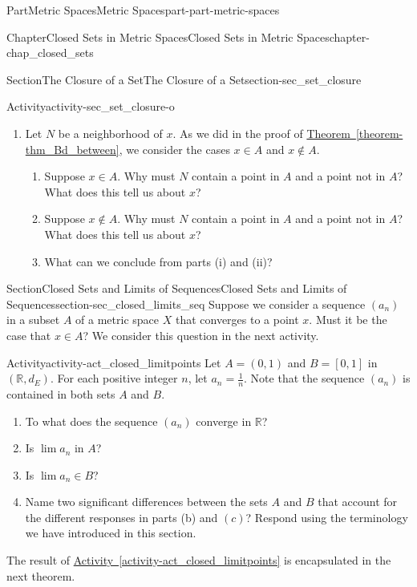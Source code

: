 \documentclass[oneside,10pt,]{book}
\newcommand{\xreffont}{\relax}
\numberwithin{equation}{chapter}
\newcommand{\R}{\mathbb{R}}
\begin{document}
\begin{partptx}{Part}{Metric Spaces}{}{Metric Spaces}{}{}{part-part-metric-spaces}
\begin{chapterptx}{Chapter}{Closed Sets in Metric Spaces}{}{Closed Sets in Metric Spaces}{}{}{chapter-chap_closed_sets}
\begin{sectionptx}{Section}{The Closure of a Set}{}{The Closure of a Set}{}{}{section-sec_set_closure}
\begin{activity}{Activity}{}{activity-sec_set_closure-o}
\begin{enumerate}[font=\bfseries,label=(\alph*),ref=\alph*]
\item{}Let \(N\) be a neighborhood of \(x\). As we did in the proof of \hyperref[theorem-thm_Bd_between]{Theorem~{\xreffont\ref{theorem-thm_Bd_between}}}, we consider the cases \(x \in A\) and \(x \notin A\).%
\begin{enumerate}[font=\bfseries,label=(\roman*),ref=\theenumi.\roman*]%
\item{}Suppose \(x \in A\). Why must \(N\) contain a point in \(A\) and a point not in \(A\)? What does this tell us about \(x\)?%
\item{}Suppose \(x \notin A\). Why must \(N\) contain a point in \(A\) and a point not in \(A\)? What does this tell us about \(x\)?%
\item{}What can we conclude from parts (i) and (ii)?%
\end{enumerate}%
\end{enumerate}%
\end{activity}%
\end{sectionptx}
%
%
\typeout{************************************************}
\typeout{************************************************}
%
\begin{sectionptx}{Section}{Closed Sets and Limits of Sequences}{}{Closed Sets and Limits of Sequences}{}{}{section-sec_closed_limits_seq}
Suppose we consider a sequence \((a_n)\) in a subset \(A\) of a metric space \(X\) that converges to a point \(x\). Must it be the case that \(x \in A\)? We consider this question in the next activity.%
\begin{activity}{Activity}{}{activity-act_closed_limitpoints}%
Let \(A = (0,1)\) and \(B = [0,1]\) in \((\R, d_E)\). For each positive integer \(n\), let \(a_n =\frac{1}{n}\). Note that the sequence \((a_n)\) is contained in both sets \(A\) and \(B\).%
\begin{enumerate}[font=\bfseries,label=(\alph*),ref=\alph*]%
\item{}To what does the sequence \((a_n)\) converge in \(\R\)?%
\item{}Is \(\lim a_n\) in \(A\)?%
\item{}Is \(\lim a_n \in B\)?%
\item{}Name two significant differences between the sets \(A\) and \(B\) that account for the different responses in parts (b) and \((c)\)? Respond using the terminology we have introduced in this section.%
\end{enumerate}%
\end{activity}%
The result of \hyperref[activity-act_closed_limitpoints]{Activity~{\xreffont\ref{activity-act_closed_limitpoints}}} is encapsulated in the next theorem.%

\end{sectionptx}
\end{chapterptx}
\end{partptx}
\end{document}
